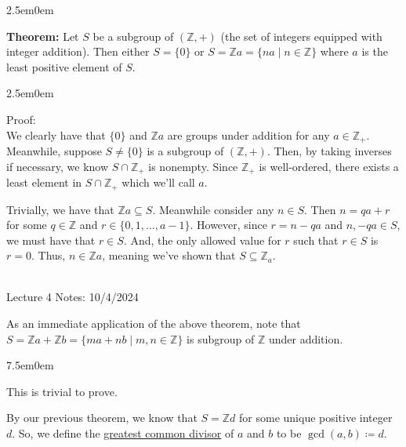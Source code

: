 \documentclass{book}
\newcommand{\hOne}{%
   \color{Black}%
   \fontsize{14}{16}\selectfont%
}
\newcommand{\hTwo}{%
\color{MidnightBlue}%
   \fontsize{13}{15}\selectfont%
}
\newcommand{\hThree}{%
   \color{PineGreen!85!Orange}
   \fontsize{12}{14}\selectfont%
}
\newcommand{\myComment}{%
   \color{RawerSienna}%
   \fontsize{12}{14}\selectfont%
}
\newenvironment{myIndent}{%
   \begin{adjustwidth}{2.5em}{0em}%
}{%
   \end{adjustwidth}%
}
\newenvironment{myTindent}{%
   \begin{adjustwidth}{7.5em}{0em}%
}{%
   \end{adjustwidth}%
}
\newcommand{\udefine}[1]{{%
   \setulcolor{Red}%
   \setul{0.14em}{0.07em}%
   \ul{#1}%
}}
\newcommand{\blab}[1]{\textbf{#1}}
\newcommand{\mySepTwo}[1][.]{%
   {\noindent\color{#1}{\rule{6.5in}{0.5mm}}}\\%
}
\newcommand{\retTwo}{\hfill\bigbreak}
\newcommand{\mHeader}[1]{{
   \color{Black}%
   \fontsize{20}{18}\selectfont%
   #1\retTwo
}}
\begin{document}
\begin{myIndent}\hTwo
	\blab{Theorem:} Let $S$ be a subgroup of $(\mathbb{Z}, +)$ (the set of integers equipped with integer addition). Then either $S = \{0\}$ or $S = \mathbb{Z}a = \{na \mid n \in \mathbb{Z}\}$ where $a$ is the least positive element of $S$.

	
	\begin{myIndent}\hThree
		Proof:\\
		We clearly have that $\{0\}$ and $\mathbb{Z}a$ are groups under addition for any $a \in \mathbb{Z}_+$.\\ Meanwhile, suppose $S \neq \{0\}$ is a subgroup of $(\mathbb{Z}, +)$. Then, by taking inverses if necessary, we know $S \cap \mathbb{Z}_+$ is nonempty. Since $\mathbb{Z}_+$ is well-ordered, there exists a least element in $S \cap \mathbb{Z}_+$ which we'll call $a$.\retTwo

		Trivially, we have that $\mathbb{Z}a \subseteq S$. Meanwhile consider any $n \in S$. Then $n = qa + r$ for some $q \in \mathbb{Z}$ and $r \in \{0, 1, \ldots, a - 1\}$. However, since $r = n - qa$ and $n, -qa \in S$, we must have that $r \in S$. And, the only allowed value for $r$ such that $r \in S$ is $r = 0$. Thus, $n \in \mathbb{Z}a$, meaning we've shown that $S \subseteq \mathbb{Z}_a$.\retTwo
	\end{myIndent}
\end{myIndent}

\hOne\mySepTwo

\mHeader{Lecture 4 Notes: 10/4/2024}

As an immediate application of the above theorem, note that $S = \mathbb{Z}a + \mathbb{Z}b = \{ma + nb \mid m, n \in \mathbb{Z}\}$ is subgroup of $\mathbb{Z}$ under addition.
\begin{myTindent}\myComment
	This is trivial to prove.\retTwo
\end{myTindent}

By our previous theorem, we know that $S = \mathbb{Z}d$ for some unique positive integer $d$. So, we define the \udefine{greatest common divisor} of $a$ and $b$ to be $\gcd(a, b) \coloneq d$.
\end{document}
